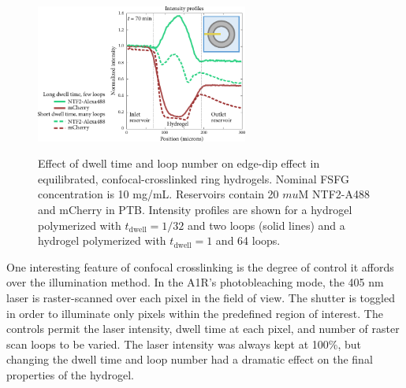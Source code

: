 \begin{figure} %
\caption{Effect of dwell time and loop number on edge-dip effect in equilibrated, confocal-crosslinked ring hydrogels.  Nominal FSFG concentration is 10 mg/mL.  Reservoirs contain 20 $mu$M NTF2-A488 and mCherry in PTB.  Intensity profiles are shown for a hydrogel polymerized with $t_\mathrm{dwell} = 1/32$ and two loops (solid lines) and a hydrogel polymerized with $t_\mathrm{dwell} = 1$ and 64 loops. \\}
\centering
\includegraphics[width=0.62\textwidth]{figs/ch03/dwell-time-effect}
\label{fig:dwell-time-effect}
\end{figure} %

One interesting feature of confocal crosslinking is the degree of control it affords over the illumination method.  In the A1R's photobleaching mode, the 405 nm laser is raster-scanned over each pixel in the field of view.  The shutter is toggled in order to illuminate only pixels within the predefined region of interest.  The controls permit the laser intensity, dwell time at each pixel, and number of raster scan loops to be varied.  The laser intensity was always kept at 100\%, but changing the dwell time and loop number had a dramatic effect on the final properties of the hydrogel.

